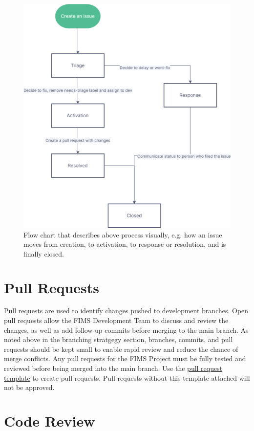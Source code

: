 \documentclass[
]{book}
\begin{document}
\begin{figure}
\includegraphics[width=0.75\linewidth]{New Flowchart} \caption{Flow chart that describes above process visually, e.g. how an issue moves from creation, to activation, to response or resolution, and is finally closed.}\label{fig:flowchart}
\end{figure}

\hypertarget{pull-requests}{%
\section{Pull Requests}\label{pull-requests}}

Pull requests are used to identify changes pushed to development branches. Open pull requests allow the FIMS Development Team to discuss and review the changes, as well as add follow-up commits before merging to the main branch. As noted above in the branching stratgegy section, branches, commits, and pull requests should be kept small to enable rapid review and reduce the chance of merge conflicts. Any pull requests for the FIMS Project must be fully tested and reviewed before being merged into the main branch.
Use the \href{https://github.com/NOAA-FIMS/FIMS/blob/main/.github/PULL_REQUEST_TEMPLATE/pull_request_template.md}{pull request template} to create pull requests. Pull requests without this template attached will not be approved.

\hypertarget{code-review}{%
\section{Code Review}\label{code-review}}
\end{document}
